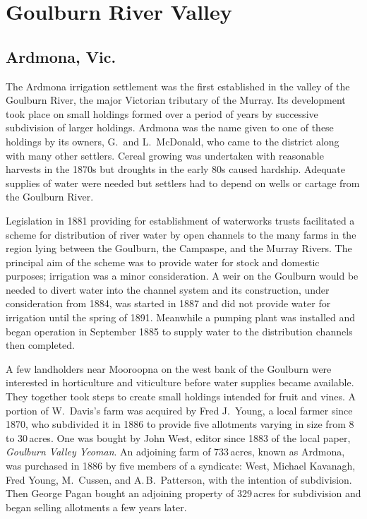 \section*{Goulburn River Valley}

\subsection*{Ardmona, Vic.}

The Ardmona irrigation settlement was the first established in the
valley of the Goulburn River, the major Victorian tributary of the
Murray.  Its development took place on small holdings formed over a
period of years by successive subdivision of larger holdings.  Ardmona
was the name given to one of these holdings by its owners, G.~and
L.~McDonald, who came to the district along with many other settlers.
Cereal growing was undertaken with reasonable harvests in the 1870s
but droughts in the early 80s caused hardship.  Adequate supplies of
water were needed but settlers had to depend on wells or cartage from
the Goulburn River.  

Legislation in 1881 providing for establishment of waterworks trusts
facilitated a scheme for distribution of river water by open channels
to the many farms in the region lying between the Goulburn, the
Campaspe, and the Murray Rivers.  The principal aim of the scheme was
to provide water for stock and domestic purposes; irrigation was a
minor consideration.  A weir on the Goulburn would be needed to divert
water into the channel system and its construction, under
consideration from 1884, was started in 1887 and did not provide water
for irrigation until the spring of 1891. Meanwhile a pumping plant was
installed and began operation in September 1885 to supply water to the
distribution channels then
completed.

A few landholders near Mooroopna on the west bank of the Goulburn were
interested in horticulture and viticulture before water supplies
became available.  They together took steps to create small holdings
intended for fruit and vines.  A portion of W.~Davis's farm was
acquired by Fred J.~Young, a local farmer since 1870, who subdivided
it in 1886 to provide five allotments varying in size from 8 to
30\,acres. One was bought by John West, editor since 1883 of the local
paper, \textsl{Goulburn Valley Yeoman}.  An adjoining farm of
733\,acres, known as Ardmona, was purchased in 1886 by five members of
a syndicate: West, Michael Kavanagh, Fred Young, M.~Cussen, and
A.\,B.~Patterson, with the intention of subdivision.  Then George
Pagan bought an adjoining property of 329\,acres for subdivision and
began selling allotments a few years later.


